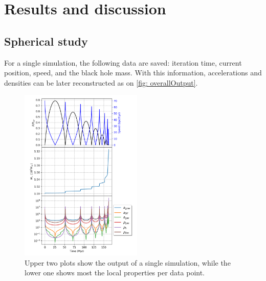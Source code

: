 
%



\chapter{Results and discussion}
	\section{Spherical study}
	For a single simulation, the following data are saved: iteration time, current position, speed, and the black hole mass. With this information, accelerations and densities can be later reconstructed as on \autoref{fig: overallOutput}.
	\begin{figure}[h]
		\centering
		\includegraphics[width = 0.52\textwidth]{"../Files/Week 6/properties_s02v70"}
		\caption{Upper two plots show the output of a single simulation, while the lower one shows most the local properties per data point.}
		\label{fig: overallOutput}
	\end{figure}
	
